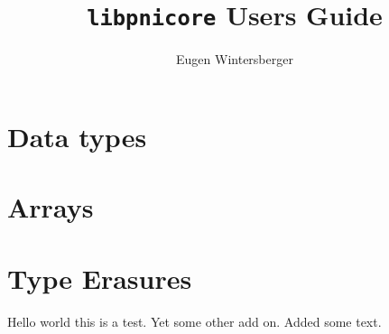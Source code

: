 \documentclass[a4paper]{book}
\title{{\Huge{\tt libpnicore} Users Guide}}
\author{Eugen Wintersberger}
\begin{document}
\maketitle
\tableofcontents

\chapter{Data types}

\FloatBarrier

\chapter{Arrays}

\FloatBarrier

\chapter{Type Erasures}
Hello world this is a test. Yet some other add on.
Added some text.
\FloatBarrier
\end{document}
